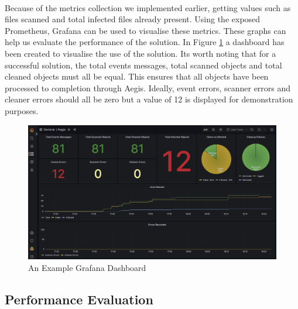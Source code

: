 \documentclass[12pt, conference, final, a4paper, onecolumn, compsoc]{IEEEtran}
\begin{document}
\paragraph{}
Because of the metrics collection we implemented earlier, getting values such as
files scanned and total infected files already present. Using the exposed
Prometheus, Grafana can be used to visualise these metrics. These graphs can
help us evaluate the performance of the solution. In Figure \ref{fig:grafana} a
dashboard has been created to visualise the use of the solution. Its worth
noting that for a successful solution, the total events messages, total scanned
objects and total cleaned objects must all be equal. This ensures that all
objects have been processed to completion through Aegis. Ideally, event errors,
scanner errors and cleaner errors should all be zero but a value of 12 is
displayed for demonstration purposes.

\begin{figure}[H]
  \centering \includegraphics[scale=0.31]{images/grafana.png}
  \caption{An Example Grafana Dashboard}
  \label{fig:grafana}
\end{figure}

\subsection{Performance Evaluation}
\paragraph{}

\end{document}
